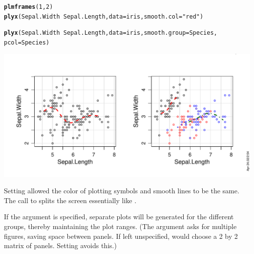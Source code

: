 \documentclass[11pt]{article}\usepackage[]{graphicx}\usepackage[]{color}
\makeatletter
\def\maxwidth{ %
  \ifdim\Gin@nat@width>\linewidth
    \linewidth
  \else
    \Gin@nat@width
  \fi
}
\newcommand{\hlnum}[1]{\textcolor[rgb]{0.686,0.059,0.569}{#1}}%
\newcommand{\hlstr}[1]{\textcolor[rgb]{0.192,0.494,0.8}{#1}}%
\newcommand{\hlopt}[1]{\textcolor[rgb]{0,0,0}{#1}}%
\newcommand{\hlstd}[1]{\textcolor[rgb]{0.345,0.345,0.345}{#1}}%
\newcommand{\hlkwc}[1]{\textcolor[rgb]{0.333,0.667,0.333}{#1}}%
\newcommand{\hlkwd}[1]{\textcolor[rgb]{0.737,0.353,0.396}{\textbf{#1}}}%
\newenvironment{kframe}{%
 \def\at@end@of@kframe{}%
 \ifinner\ifhmode%
  \def\at@end@of@kframe{\end{minipage}}%
  \begin{minipage}{\columnwidth}%
 \fi\fi%
 \def\FrameCommand##1{\hskip\@totalleftmargin \hskip-\fboxsep
 \colorbox{shadecolor}{##1}\hskip-\fboxsep
     \hskip-\linewidth \hskip-\@totalleftmargin \hskip\columnwidth}%
 \MakeFramed {\advance\hsize-\width
   \@totalleftmargin\z@ \linewidth\hsize
   \@setminipage}}%
 {\par\unskip\endMakeFramed%
 \at@end@of@kframe}
\newenvironment{knitrout}{}{} %
\makeatother
\begin{document}
\begin{knitrout}
\color{fgcolor}\begin{kframe}
\begin{alltt}
\hlkwd{plmframes}\hlstd{(}\hlnum{1}\hlstd{,}\hlnum{2}\hlstd{)}
\hlkwd{plyx}\hlstd{(Sepal.Width}\hlopt{~}\hlstd{Sepal.Length,} \hlkwc{data}\hlstd{=iris,} \hlkwc{smooth.col}\hlstd{=}\hlstr{"red"}\hlstd{)}

\hlkwd{plyx}\hlstd{(Sepal.Width}\hlopt{~}\hlstd{Sepal.Length,} \hlkwc{data}\hlstd{=iris,} \hlkwc{smooth.group}\hlstd{=Species,}
     \hlkwc{pcol}\hlstd{=Species)}
\end{alltt}
\end{kframe}
\includegraphics[width=\maxwidth]{figure/plyx_smooth-1} 

\end{knitrout}
Setting  allowed the color of plotting symbols and smooth
lines to be the same.
The call to  splits the screen essentially like 
.

If the argument  is specified, separate plots will be generated
for the different groups, thereby maintaining the plot ranges.
(The argument  asks for multiple figures, saving space between panels. 
If left unspecified,
 would choose a 2 by 2 matrix of panels. 
Setting  avoids this.)
\end{document}
